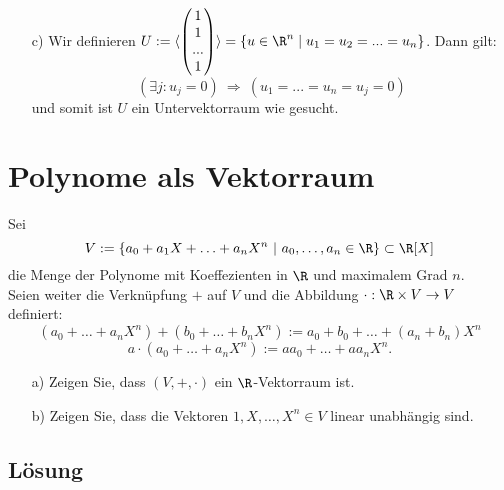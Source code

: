 \begin{itemize}
\item[c)]
Wir definieren $U:=\langle \begin{pmatrix} 1  \\1\\...\\ 1 \end{pmatrix} \rangle = \{u \in \R^n \mid u_1=u_2=...=u_n\}$. Dann gilt:
$$
\left( \exists j: u_j=0 \right) \  \Rightarrow \ (u_1=...=u_n=u_j=0)
$$
und somit ist $U$ ein Untervektorraum wie gesucht.
\end{itemize}

\newpage
\section{Polynome als Vektorraum}

Sei
$$
	V := \{a_0 +a_1X+\ldots +a_nX^n~|~ a_0,\ldots, a_n\in \R \} \subset \R[X]
$$
die Menge der Polynome mit Koeffezienten in $\R$ und maximalem Grad $n$.\\

Seien weiter die Verkn\"upfung $+$ auf $V$ und die Abbildung $\cdot: \R\times V \to V$ definiert:
$$
	(a_0 +\ldots +a_nX^n) + (b_0 +\ldots +b_nX^n) := a_0 +b_0+\ldots +(a_n+b_n)X^n
$$
$$
	a\cdot(a_0 +\ldots +a_nX^n) := aa_0 +\ldots +aa_nX^n.
$$

\begin{itemize}
	\item[a)] Zeigen Sie, dass $(V,+,\cdot)$  ein $\R$-Vektorraum ist.
	\item[b)] Zeigen Sie, dass die Vektoren $1, X, \ldots, X^n \in V$ linear unabh\"angig sind.
\end{itemize}

\subsection*{L\"osung}

